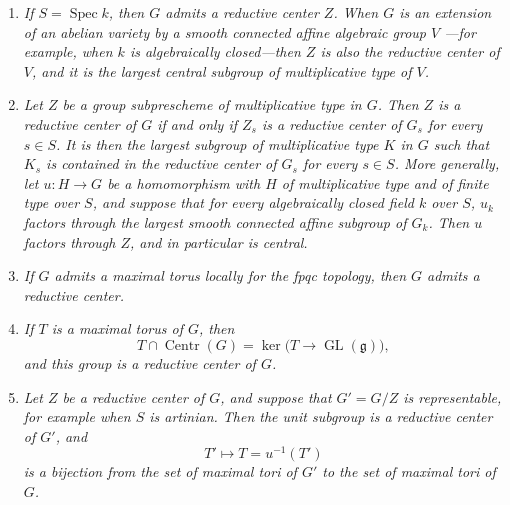 \begin{enumerate}
\item[\emph{(a)}] \emph{If \(S=\operatorname{Spec}k\), then \(G\)
admits a reductive center \(Z\). When \(G\) is an extension of an
abelian variety by a smooth connected affine algebraic group \(V\)
---for example, when \(k\) is algebraically closed---then \(Z\) is
also the reductive center of \(V\), and it is the largest central
subgroup of multiplicative type of \(V\).}

\item[\emph{(b)}] \emph{Let \(Z\) be a group subprescheme of
multiplicative type in \(G\). Then \(Z\) is a reductive center of
\(G\) if and only if \(Z_s\) is a reductive center of \(G_s\) for
every \(s\in S\). It is then the largest subgroup of multiplicative
type \(K\) in \(G\) such that \(K_s\) is contained in the reductive
center of \(G_s\) for every \(s\in S\). More generally, let
\(u:H\to G\) be a homomorphism with \(H\) of multiplicative type and
of finite type over \(S\), and suppose that for every algebraically
closed field \(k\) over \(S\), \(u_k\) factors through the largest
smooth connected affine subgroup of \(G_k\). Then \(u\) factors
through \(Z\), and in particular is central.}

\item[\emph{(c)}] \emph{If \(G\) admits a maximal torus locally for
the fpqc topology, then \(G\) admits a reductive center.}

\item[\emph{(d)}] \emph{If \(T\) is a maximal torus of \(G\), then}
\[
  T\cap\operatorname{Centr}(G)
  =\ker\bigl(T\longrightarrow\operatorname{GL}(\mathfrak g)\bigr),
\]
\emph{and this group is a reductive center of \(G\).}

\item[\emph{(e)}] \emph{Let \(Z\) be a reductive center of \(G\),
and suppose that \(G'=G/Z\) is representable, for example when \(S\)
is artinian. Then the unit subgroup is a reductive center of \(G'\),
and}
\[
  T'\longmapsto T=u^{-1}(T')
\]
\emph{is a bijection from the set of maximal tori of \(G'\) to the
set of maximal tori of \(G\).}
\end{enumerate}

